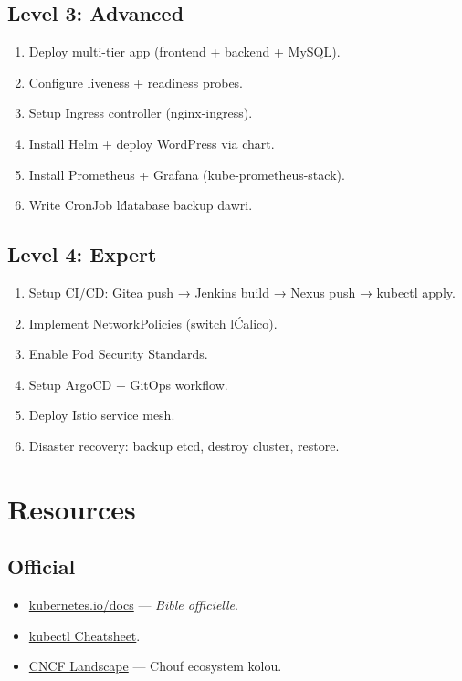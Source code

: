 \documentclass[11pt,a4paper]{book}
\newcommand{\tuni}[1]{\textit{\color{k8sdark}#1}}
\begin{document}
\section{Level 3: Advanced}

\begin{enumerate}
  \item Deploy multi-tier app (frontend + backend + MySQL).
  \item Configure liveness + readiness probes.
  \item Setup Ingress controller (nginx-ingress).
  \item Install Helm + deploy WordPress via chart.
  \item Install Prometheus + Grafana (kube-prometheus-stack).
  \item Write CronJob l\'database backup dawri.
\end{enumerate}

\section{Level 4: Expert}

\begin{enumerate}
  \item Setup CI/CD: Gitea push → Jenkins build → Nexus push → kubectl apply.
  \item Implement NetworkPolicies (switch l\'Calico).
  \item Enable Pod Security Standards.
  \item Setup ArgoCD + GitOps workflow.
  \item Deploy Istio service mesh.
  \item Disaster recovery: backup etcd, destroy cluster, restore.
\end{enumerate}

\cleardoublepage

\chapter{Resources}

\section{Official}

\begin{itemize}
  \item \href{https://kubernetes.io/docs/}{kubernetes.io/docs} --- \tuni{Bible officielle}.
  \item \href{https://kubernetes.io/docs/reference/kubectl/cheatsheet/}{kubectl Cheatsheet}.
  \item \href{https://landscape.cncf.io}{CNCF Landscape} --- Chouf ecosystem kolou.
\end{itemize}
\end{document}
